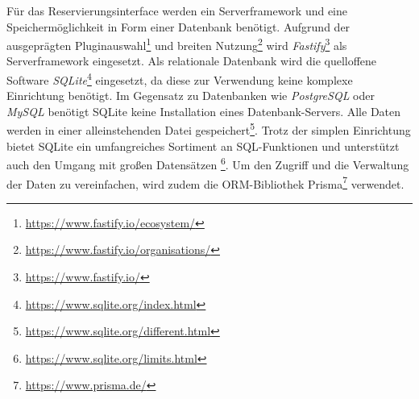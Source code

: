 Für das Reservierungsinterface werden ein Serverframework und eine Speichermöglichkeit in Form einer
Datenbank benötigt. Aufgrund der ausgeprägten
Pluginauswahl\footnote{\url{https://www.fastify.io/ecosystem/}} und breiten
Nutzung\footnote{\url{https://www.fastify.io/organisations/}} wird
\textit{Fastify}\footnote{\url{https://www.fastify.io/}} als Serverframework eingesetzt. Als
relationale Datenbank wird die quelloffene Software
\textit{SQLite}\footnote{\url{https://www.sqlite.org/index.html}} eingesetzt, da diese zur
Verwendung keine komplexe Einrichtung benötigt. Im Gegensatz zu Datenbanken wie \textit{PostgreSQL}
oder \textit{MySQL} benötigt SQLite keine Installation eines Datenbank-Servers. Alle Daten werden in
einer alleinstehenden Datei gespeichert\footnote{\url{https://www.sqlite.org/different.html}}. Trotz
der simplen Einrichtung bietet SQLite ein umfangreiches Sortiment an SQL-Funktionen und unterstützt
auch den Umgang mit großen Datensätzen \footnote{\url{https://www.sqlite.org/limits.html}}. Um den
Zugriff und die Verwaltung der Daten zu vereinfachen, wird zudem die ORM-Bibliothek
Prisma\footnote{\url{https://www.prisma.de/}} verwendet.

